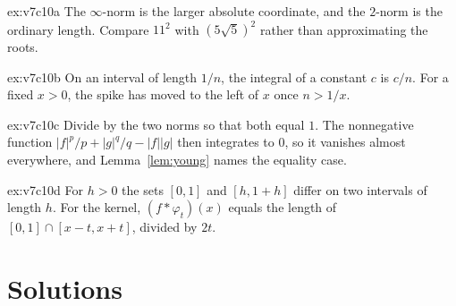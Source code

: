 \begin{hint}{ex:v7c10a}
The $\infty$-norm is the larger absolute coordinate, and the $2$-norm is the ordinary length. Compare $11^2$ with $(5\sqrt5)^2$ rather than approximating the roots.
\end{hint}
\begin{hint}{ex:v7c10b}
On an interval of length $1/n$, the integral of a constant $c$ is $c/n$. For a fixed $x>0$, the spike has moved to the left of $x$ once $n>1/x$.
\end{hint}
\begin{hint}{ex:v7c10c}
Divide by the two norms so that both equal $1$. The nonnegative function $|f|^p/p+|g|^q/q-|f||g|$ then integrates to $0$, so it vanishes almost everywhere, and Lemma~\ref{lem:young} names the equality case.
\end{hint}
\begin{hint}{ex:v7c10d}
For $h>0$ the sets $[0,1]$ and $[h,1+h]$ differ on two intervals of length $h$. For the kernel, $(f*\varphi_t)(x)$ equals the length of $[0,1]\cap[x-t,x+t]$, divided by $2t$.
\end{hint}

\section{Solutions}

